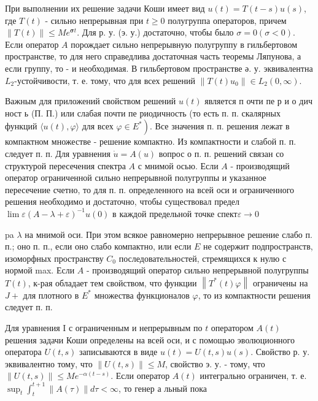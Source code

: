 \documentclass[10pt]{article}
\begin{document}
При выполнении их решение задачи Коши имеет вид $u(t)=T(t-s) u(s)$, где $T(t)$ - сильно непрерывная при $t \geqslant 0$ полугруппа операторов, причем $\|T(t)\| \leqslant M e^{\boldsymbol{\sigma} t}$. Для р. у. (э. у.) достаточно, чтобы было $\sigma=0(\sigma<0)$. Если оператор $A$ порождает сильно непрерывную полугруппу в гильбертовом пространстве, то для него справедлива достаточная часть теоремы Ляпунова, а если группу, то - и необходимая. В гильбертовом пространстве ә. у. эквивалентна $L_{2}$-устойчивости, т. е. тому, что для всех решений $\left\|T(t) u_{0}\right\| \in L_{2}(0, \infty)$.



Важным для приложений свойством решений $u(t)$ является п очти пе р и о дич ност ь (П. П.) или слабая почти пе риодичность (то есть п. п. скалярных функций $\langle u(t), \varphi\rangle$ для всех $\left.\varphi \in E^{*}\right)$. Все значения п. п. решения лежат в компактном множестве - решение компактно. Из компактности и слабой п. п. следует п. п. Для уравнения $\dot{u}=A(u)$ вопрос о п. п. решений связан со структурой пересечения спектра $A$ с мнимой осью. Если $A$ - производящий оператор ограниченной сильно непрерывной полугруппы и указанное пересечение счетно, то для п. п. определенного на всей оси и ограниченного решения необходимо и достаточно, чтобы существовал предел $\lim \varepsilon(A-\lambda+\varepsilon)^{-1} u(0)$ в каждой предельной точке спект$\varepsilon \rightarrow 0$

pa $\lambda$ на мнимой оси. При этом всякое равномерно непрерывное решение слабо п. п.; оно п. п., если оно слабо компактно, или если $E$ не содержит подпространств, изоморфных пространству $C_{0}$ последовательностей, стремящихся к нулю с нормой max. Если $A$ - производящий оператор сильно непрерывной полугруппы $T(t)$, к-рая обладает тем свойством, что функции $\left\|T^{*}(t) \varphi\right\|$ ограничены на $J+$ для плотного в $E^{*}$ множества функционалов $\varphi$, то из компактности решения следует п. п.



Для уравнения I с ограниченным и непрерывным по $t$ оператором $A(t)$ решения задачи Коши определены на всей оси, и с помощью эволюционного оператора $U(t, s)$ записываются в виде $u(t)=U(t, s) u(s)$. Свойство р. у. эквивалентно тому, что $\|U(t, s)\| \leqslant M$, свойство э. у. - тому, что $\|U(t, s)\| \leqslant M e^{-\alpha(t-s)}$. Если оператор $A(t)$ интегрально ограничен, т. е. $\sup _{t} \int_{t}^{t+1}\|A(\tau)\| d \tau<\infty$, то генер а льный пока
\end{document}

